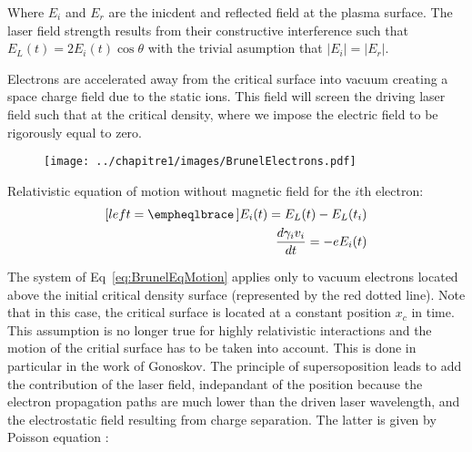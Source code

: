 \noindent Where $E_i$ and $E_r$ are the inicdent and reflected field at the plasma surface. The laser field strength results from their constructive interference such that $E_L(t) = 2E_i(t)\cos\theta$ with the trivial asumption that $|E_i| = |E_r|$.


\noindent Electrons are accelerated away from the critical surface into vacuum creating a space charge field due to the static ions. This field will screen the driving laser field such that at the critical density, where we impose the electric field to be rigorously equal to zero. 


\begin{minipage}{0.5\textwidth}
\begin{figure}[H]
\centering
\texttt{[image: ../chapitre1/images/BrunelElectrons.pdf]}\\
\end{figure}
\end{minipage} \hfill
\begin{minipage}{0.45\textwidth}
Relativistic equation of motion without magnetic field for the $i$th electron:
\begin{subequations}
\label{eq:BrunelEqMotion}
\begin{align}[left = \empheqlbrace\,]
   E_i(t) = E_L(t) - E_L(t_i) \\
   \frac{d\gamma_iv_i}{dt} = -eE_i(t)
\end{align}
\label{eq:BrunelEquationMotion}
\end{subequations}
\end{minipage}
\begin{minipage}{0.5\textwidth}
\end{minipage}

\noindent The system of Eq~\ref{eq:BrunelEqMotion} applies only to vacuum electrons located above the initial critical density surface (represented by the red dotted line).  Note that in this case, the critical surface is located at a constant position $x_c$ in time. This assumption is no longer true for highly relativistic interactions \cite{TheseHenri} and the motion of the critial surface has to be taken into account. This is done in particular in the work of Gonoskov\cite{gonoskov2011ultrarelativistic}. The principle of supersoposition leads to add the contribution of the laser field, indepandant of the position because the electron propagation paths are much lower than the driven laser wavelength, and the electrostatic field resulting from charge separation. The latter is given by Poisson equation :


